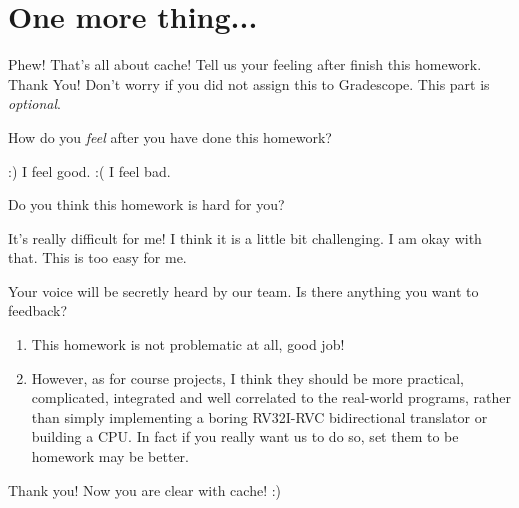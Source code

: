 \section*{One more thing...}
Phew! That's all about cache! Tell us your feeling after finish this
homework. Thank You! Don't worry if you did not assign this to
Gradescope. This part is \emph{optional}.

\begin{questions}

\question[0] How do you \emph{feel} after you have done this homework?

{
    \begin{solution}
        \begin{checkboxes}
            \CorrectChoice :) I feel good.
            \choice :( I feel bad.
        \end{checkboxes}
    \end{solution}
}

\question[0] Do you think this homework is hard for you?

{
    \begin{solution}
        \begin{checkboxes}
            \choice It's really difficult for me!
            \choice I think it is a little bit challenging.
            \CorrectChoice I am okay with that.
            \choice This is too easy for me.
        \end{checkboxes}
    \end{solution}
}

\question[0] Your voice will be secretly heard by our team.
Is there anything you want to feedback?

{
    \begin{solution}
        \begin{enumerate}
            \item This homework is not problematic at all, good job!
            \item However, as for course projects, I think they should be more practical, complicated, integrated and well correlated to the real-world programs, rather than simply implementing a boring RV32I-RVC bidirectional translator or building a CPU. In fact if you really want us to do so, set them to be homework may be better.
        \end{enumerate}
    \end{solution}
}

\vspace*{\fill}
\begin{center}
\Large Thank you! Now you are clear with cache! :)
\end{center}

\end{questions}
